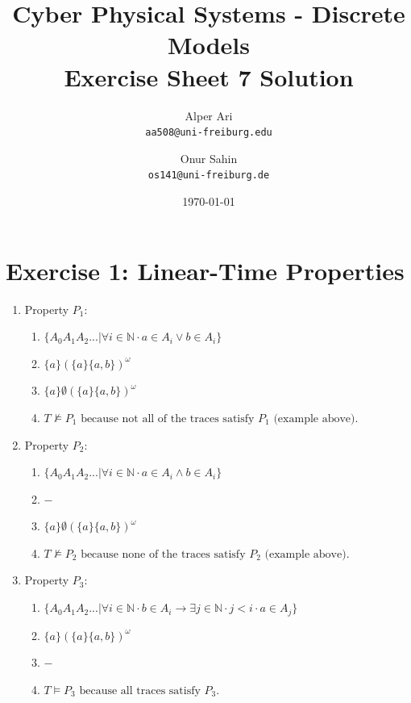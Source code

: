\documentclass{article}
\title{
Cyber Physical Systems - Discrete Models \\
[0.2em]Exercise Sheet 7 Solution
}
\author{
  Alper Ari\\
  \texttt{aa508@uni-freiburg.edu}
  \and
  Onur Sahin\\
  \texttt{os141@uni-freiburg.de}
}
\date{\today}
\newcommand{\N}{\mathbb{N}}
\begin{document}
\maketitle

\section*{Exercise 1:  Linear-Time Properties}
\begin{enumerate}
    \item Property $P_1:$
    \begin{enumerate}[i]
        \item 
        $
            \{ A_0 A_1 A_2 ... | \forall i \in \N \cdot a\in A_i \vee b\in A_i \}
        $
        \item 
        $
            \{a\}(\{a\}\{a,b\})^\omega
        $
        \item 
        $
            \{a\} \emptyset (\{a\}\{a,b\})^\omega
        $
        \item 
        $
            T \nvDash P_1 \text{ because not all of the traces satisfy $P_1$ (example above)}.
        $
    \end{enumerate}

    \item Property $P_2:$
    \begin{enumerate}[i]
        \item 
        $
            \{ A_0 A_1 A_2 ... | \forall i \in \N \cdot a\in A_i \wedge b\in A_i \}
        $
        \item 
        $
            -
        $
        \item 
        $
            \{a\} \emptyset (\{a\}\{a,b\})^\omega
        $
        \item 
        $
            T \nvDash P_2 \text{ because none of the traces satisfy $P_2$ (example above)}.
        $
    \end{enumerate}

    \item Property $P_3:$
    \begin{enumerate}[i]
        \item 
        $
            \{ A_0 A_1 A_2 ... | \forall i \in \N \cdot b\in A_i \longrightarrow \exists j \in \N \cdot j<i \cdot a \in A_j \}
        $
        \item 
        $
            \{a\} (\{a\}\{a,b\})^\omega
        $
        \item 
        $
            -
        $
        \item 
        $
            T \vDash P_3 \text{ because all traces satisfy $P_3$}.
        $
    \end{enumerate}


\end{enumerate}
\end{document}
